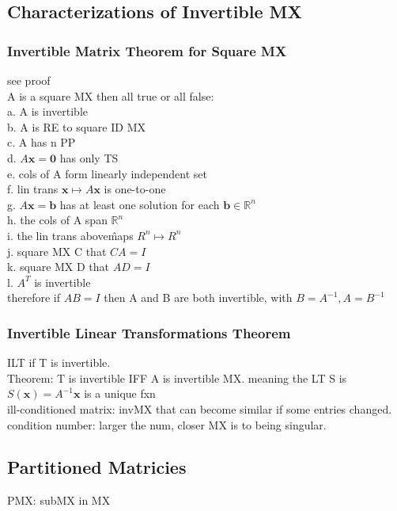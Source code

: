 \documentclass[12pt]{article}
\newcommand{\R}{\mathbb{R}}
\begin{document}
\subsection{Characterizations of Invertible MX}
    \subsubsection{Invertible Matrix Theorem for Square MX}
        see proof \\
        A is a square MX then all true or all false: \\
        a. A is invertible \\
        b. A is RE to square ID MX \\
        c. A has n PP \\
        d. $ A\bm{x} = \bm{0} $  has only TS \\
        e. cols of A form linearly independent set \\
        f. lin trans $ \bm{x} \mapsto A \bm{x} $  is one-to-one \\
        g. $ A\bm{x}= \bm{b} $  has at least one solution for each 
        $\bm{b}\in\R^n$  \\
        h. the cols of A span $ \R^n $  \\
        i. the lin trans above\^ maps $ R^n \mapsto R^n $  \\
        j. square MX C that $ CA = I $ \\
        k. square MX D that $ AD = I $ \\
        l. $A^{T}$  is invertible \\
        therefore
        if $ AB = I $  then A and B are both invertible, with
        $ B = A^{-1},A = B^{-1} $
    \subsubsection{Invertible Linear Transformations Theorem}
        ILT if T is invertible. \\
        Theorem: T is invertible IFF A is invertible MX. meaning
        the LT S is $ S(\bm{x}) = A^{-1}\bm{x}$ is a unique fxn \\
        ill-conditioned matrix: invMX that can become similar if some entries
        changed. \\
        condition number: larger the num, closer MX is to being singular.
\subsection{Partitioned Matricies}
    PMX: subMX in MX 
\end{document}
